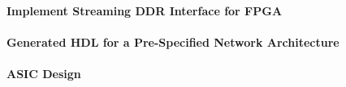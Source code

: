 \paragraph{Implement Streaming DDR Interface for FPGA}

\paragraph{Generated HDL for a Pre-Specified Network Architecture}

\paragraph{ASIC Design}
